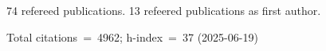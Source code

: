 74 refereed publications. 13 refeered publications as first author.

Total citations~=~4962; h-index~=~37 (2025-06-19)